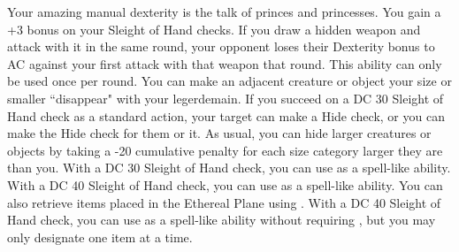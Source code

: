 {Your amazing manual dexterity is the talk of princes and princesses.}
{You gain a +3 bonus on your Sleight of Hand checks.}
{If you draw a hidden weapon and attack with it in the same round, your opponent loses their Dexterity bonus to AC against your first attack with that weapon that round. This ability can only be used once per round.}
{You can make an adjacent creature or object your size or smaller ``disappear" with your legerdemain. If you succeed on a DC 30 Sleight of Hand check as a standard action, your target can make a Hide check, or you can make the Hide check for them or it. As usual, you can hide larger creatures or objects by taking a -20 cumulative penalty for each size category larger they are than you.}
{With a DC 30 Sleight of Hand check, you can use  as a spell-like ability.}
{With a DC 40 Sleight of Hand check, you can use  as a spell-like ability. You can also retrieve items placed in the Ethereal Plane using . With a DC 40 Sleight of Hand check, you can use  as a spell-like ability without requiring , but you may only designate one item at a time.}